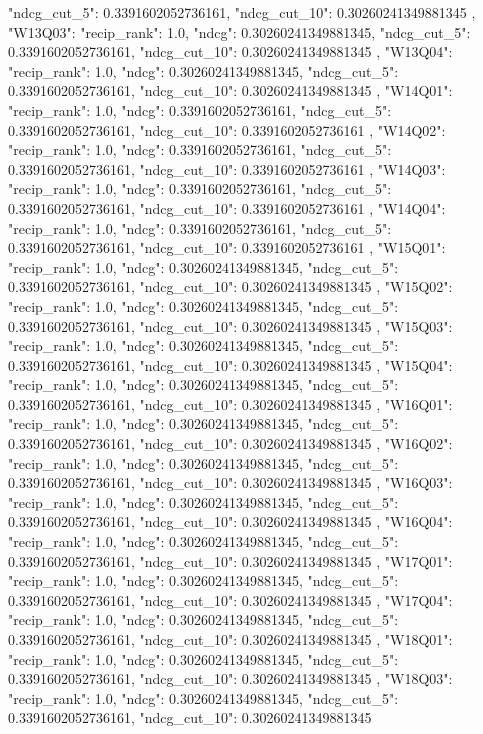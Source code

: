 {{  "ndcg_cut_5": 0.3391602052736161,
  "ndcg_cut_10": 0.30260241349881345
 },
 "W13Q03": {
  "recip_rank": 1.0,
  "ndcg": 0.30260241349881345,
  "ndcg_cut_5": 0.3391602052736161,
  "ndcg_cut_10": 0.30260241349881345
 },
 "W13Q04": {
  "recip_rank": 1.0,
  "ndcg": 0.30260241349881345,
  "ndcg_cut_5": 0.3391602052736161,
  "ndcg_cut_10": 0.30260241349881345
 },
 "W14Q01": {
  "recip_rank": 1.0,
  "ndcg": 0.3391602052736161,
  "ndcg_cut_5": 0.3391602052736161,
  "ndcg_cut_10": 0.3391602052736161
 },
 "W14Q02": {
  "recip_rank": 1.0,
  "ndcg": 0.3391602052736161,
  "ndcg_cut_5": 0.3391602052736161,
  "ndcg_cut_10": 0.3391602052736161
 },
 "W14Q03": {
  "recip_rank": 1.0,
  "ndcg": 0.3391602052736161,
  "ndcg_cut_5": 0.3391602052736161,
  "ndcg_cut_10": 0.3391602052736161
 },
 "W14Q04": {
  "recip_rank": 1.0,
  "ndcg": 0.3391602052736161,
  "ndcg_cut_5": 0.3391602052736161,
  "ndcg_cut_10": 0.3391602052736161
 },
 "W15Q01": {
  "recip_rank": 1.0,
  "ndcg": 0.30260241349881345,
  "ndcg_cut_5": 0.3391602052736161,
  "ndcg_cut_10": 0.30260241349881345
 },
 "W15Q02": {
  "recip_rank": 1.0,
  "ndcg": 0.30260241349881345,
  "ndcg_cut_5": 0.3391602052736161,
  "ndcg_cut_10": 0.30260241349881345
 },
 "W15Q03": {
  "recip_rank": 1.0,
  "ndcg": 0.30260241349881345,
  "ndcg_cut_5": 0.3391602052736161,
  "ndcg_cut_10": 0.30260241349881345
 },
 "W15Q04": {
  "recip_rank": 1.0,
  "ndcg": 0.30260241349881345,
  "ndcg_cut_5": 0.3391602052736161,
  "ndcg_cut_10": 0.30260241349881345
 },
 "W16Q01": {
  "recip_rank": 1.0,
  "ndcg": 0.30260241349881345,
  "ndcg_cut_5": 0.3391602052736161,
  "ndcg_cut_10": 0.30260241349881345
 },
 "W16Q02": {
  "recip_rank": 1.0,
  "ndcg": 0.30260241349881345,
  "ndcg_cut_5": 0.3391602052736161,
  "ndcg_cut_10": 0.30260241349881345
 },
 "W16Q03": {
  "recip_rank": 1.0,
  "ndcg": 0.30260241349881345,
  "ndcg_cut_5": 0.3391602052736161,
  "ndcg_cut_10": 0.30260241349881345
 },
 "W16Q04": {
  "recip_rank": 1.0,
  "ndcg": 0.30260241349881345,
  "ndcg_cut_5": 0.3391602052736161,
  "ndcg_cut_10": 0.30260241349881345
 },
 "W17Q01": {
  "recip_rank": 1.0,
  "ndcg": 0.30260241349881345,
  "ndcg_cut_5": 0.3391602052736161,
  "ndcg_cut_10": 0.30260241349881345
 },
 "W17Q04": {
  "recip_rank": 1.0,
  "ndcg": 0.30260241349881345,
  "ndcg_cut_5": 0.3391602052736161,
  "ndcg_cut_10": 0.30260241349881345
 },
 "W18Q01": {
  "recip_rank": 1.0,
  "ndcg": 0.30260241349881345,
  "ndcg_cut_5": 0.3391602052736161,
  "ndcg_cut_10": 0.30260241349881345
 },
 "W18Q03": {
  "recip_rank": 1.0,
  "ndcg": 0.30260241349881345,
  "ndcg_cut_5": 0.3391602052736161,
  "ndcg_cut_10": 0.30260241349881345
}}
